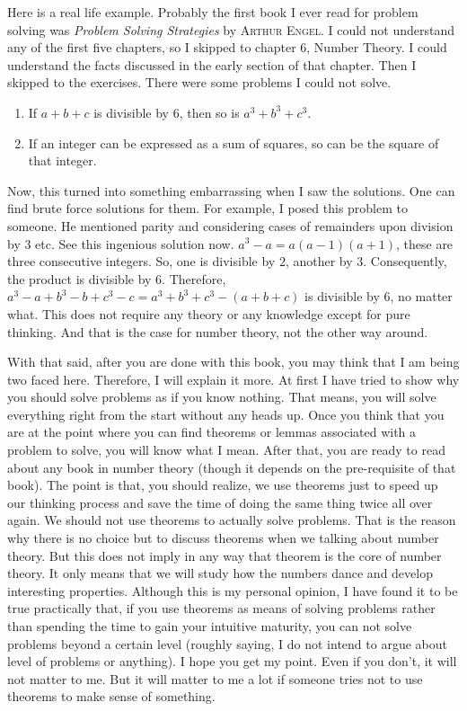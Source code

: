 \documentclass[a4paper, leqno]{article}
\theoremstyle{definition}
\theoremstyle{remark}
\begin{document}
		Here is a real life example. Probably the first book I ever read for problem solving was \textit{Problem Solving Strategies} by \textsc{Arthur Engel}. I could not understand any of the first five chapters, so I skipped to chapter $6$, Number Theory. I could understand the facts discussed in the early section of that chapter. Then I skipped to the exercises. There were some problems I could not solve.
			\begin{enumerate}
				\item If $a+b+c$ is divisible by $6$, then so is $a^3+b^3+c^3$.
				\item If an integer can be expressed as a sum of squares, so can be the square of that integer.
			\end{enumerate}
		Now, this turned into something embarrassing when I saw the solutions. One can find brute force solutions for them. For example, I posed this problem to someone. He mentioned parity and considering cases of remainders upon division by $3$ etc. See this ingenious solution now. $a^3-a=a(a-1)(a+1)$, these are three consecutive integers. So, one is divisible by $2$, another by $3$. Consequently, the product is divisible by $6$. Therefore, $a^3-a+b^3-b+c^3-c=a^3+b^3+c^3-(a+b+c)$ is divisible by $6$, no matter what. This does not require any theory or any knowledge except for pure thinking. And that is the case for number theory, not the other way around.
		
		With that said, after you are done with this book, you may think that I am being two faced here. Therefore, I will explain it more. At first I have tried to show why you should solve problems as if you know nothing. That means, you will solve everything right from the start without any heads up. Once you think that you are at the point where you can find theorems or lemmas associated with a problem to solve, you will know what I mean. After that, you are ready to read about any book in number theory (though it depends on the pre-requisite of that book). The point is that, you should realize, we use theorems just to speed up our thinking process and save the time of doing the same thing twice all over again. We should not use theorems to actually solve problems. That is the reason why there is no choice but to discuss theorems when we talking about number theory. But this does not imply in any way that theorem is the core of number theory. It only means that we will study how the numbers dance and develop interesting properties. Although this is my personal opinion, I have found it to be true practically that, if you use theorems as means of solving problems rather than spending the time to gain your intuitive maturity, you can not solve problems beyond a certain level (roughly saying, I do not intend to argue about level of problems or anything). I hope you get my point. Even if you don't, it will not matter to me. But it will matter to me a lot if someone tries not to use theorems to make sense of something.
		
\end{document}

